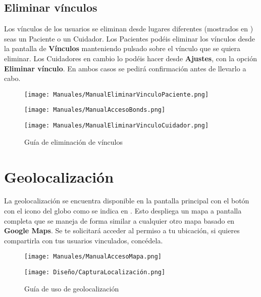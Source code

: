 \subsection{Eliminar vínculos}

Los vínculos de los usuarios se eliminan desde lugares diferentes (mostrados en ) seas un Paciente o un Cuidador. Los Pacientes podéis eliminar los vínculos desde la pantalla de \textbf{Vínculos} manteniendo pulsado sobre el vínculo que se quiera eliminar. Los Cuidadores en cambio lo podéis hacer desde \textbf{Ajustes}, con la opción \textbf{Eliminar vínculo}. En ambos casos se pedirá confirmación antes de llevarlo a cabo.

\begin{figure}[H]
    \centering
    \begin{minipage}{0.30\textwidth}
        \centering
        \texttt{[image: Manuales/ManualEliminarVinculoPaciente.png]}
    \end{minipage}\hfill
    \begin{minipage}{0.30\textwidth}
        \centering
        \texttt{[image: Manuales/ManualAccesoBonds.png]}
    \end{minipage}\hfill
    \begin{minipage}{0.30\textwidth}
        \centering
        \texttt{[image: Manuales/ManualEliminarVinculoCuidador.png]}
    \end{minipage}\hfill
    \caption{Guía de eliminación de vínculos}
    \label{man:eliminar_vinculos}
\end{figure}

\section{Geolocalización}

La geolocalización se encuentra disponible en la pantalla principal con el botón con el icono del globo como se indica en . Esto despliega un mapa a pantalla completa que se maneja de forma similar a cualquier otro mapa basado en \textbf{Google Maps}. Se te solicitará acceder al permiso a tu ubicación, si quieres compartirla con tus usuarios vinculados, concédela. 

\begin{figure}[H]
    \centering
    \begin{minipage}{0.5\textwidth}
        \centering
        \texttt{[image: Manuales/ManualAccesoMapa.png]}
    \end{minipage}\hfill
    \begin{minipage}{0.5\textwidth}
        \centering
        \texttt{[image: Diseño/CapturaLocalización.png]}
    \end{minipage}\hfill
    \caption{Guía de uso de geolocalización}
    \label{man:geolocalizacion}
\end{figure}

